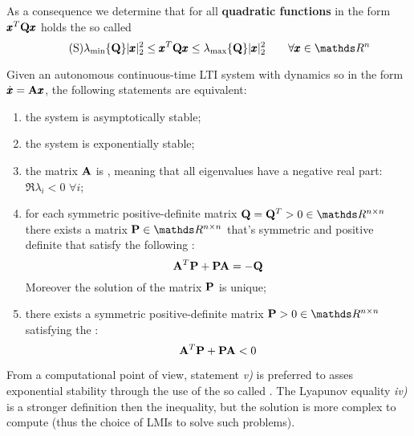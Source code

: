 	As a consequence we determine that for all \textbf{quadratic functions} in the form $\x^T \Q \x$ holds the so called \textit{}
	\begin{equation} \tag{S}
		\lambda_{\min}\{\Q\} |\x|_2^2 \leq \x^T \Q \x \leq \lambda_{\max}\{\Q\} |\x|_2^2 \qquad \forall \x \in \mathds R^n
	\end{equation}
	
	\begin{theorem} \label{th:lyap:continuoustime}
		Given an autonomous continuous-time LTI system with dynamics so in the form $\dx = \A \x$, the following statements are equivalent:
		\begin{enumerate}[\itshape i)]
			\item the system is asymptotically stable;
			\item the system is exponentially stable;
			\item the matrix $\A$ is , meaning that all eigenvalues have a negative real part: $\Re{\lambda_i} < 0 $ $\forall i$;
			\item for each symmetric positive-definite matrix $\Q = \Q^T > 0 \in \mathds R^{n\times n}$ there exists a matrix $\P \in \mathds R^{n\times n}$ that's symmetric and positive definite that satisfy the following :
			\begin{equation} \label{eq:ly:lyapequality}
				\A^T \P + \P \A = - \Q
			\end{equation}
			Moreover the solution of the matrix $\P$ is unique;
			\item there exists a symmetric positive-definite matrix $\P>0 \in \mathds R^{n\times n}$ satisfying the :
			\begin{equation} \label{eq:ly:lyapinequality}
				\A^T \P + \P\A < 0
			\end{equation}
		\end{enumerate}
	\end{theorem}
	From a computational point of view, statement \textit{v)} is preferred to asses exponential stability through the use of the so called . The Lyapunov equality \textit{iv)} is a stronger definition then the inequality, but the solution is more complex to compute (thus the choice of LMIs to solve such problems).
	
